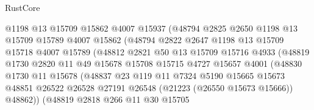 \begin{lexlean}{RustCore}
\begin{coremodule}
                          @1198
                          @13
                          @15709
                          @15862
                          @4007
                          @15937
                          (@48794
                            @2825
                            @2650
                            @1198
                            @13
                            @15709
                            @15789
                            @4007
                            @15862
                            (@48794
                              @2822
                              @2647
                              @1198
                              @13
                              @15709
                              @15718
                              @4007
                              @15789
                              (@48812
                                @2821
                                @50
                                @13
                                @15709
                                @15716
                                @4933
                                (@48819
                                  @1730
                                  @2820
                                  @11
                                  @49
                                  @15678
                                  @15708
                                  @15715
                                  @4727
                                  @15657
                                  @4001
                                  (@48830
                                    @1730
                                    @11
                                    @15678
                                    (@48837
                                      @23
                                      @119
                                      @11
                                      @7324
                                      @5190
                                      @15665
                                      @15673
                                      @48851
                                      @26522
                                      @26528
                                      @27191
                                      @26548
                                      (@21223 (@26550 @15673 @15666))
                                      @48862))
                                  (@48819
                                    @2818
                                    @266
                                    @11
                                    @30
                                    @15705

\end{coremodule}
\end{lexlean}
